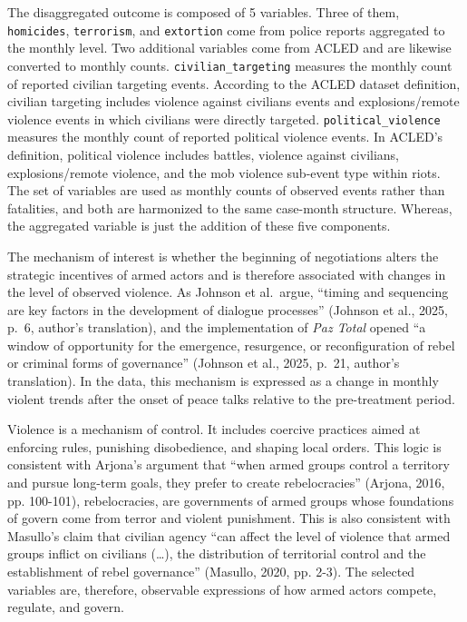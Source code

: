 \documentclass[11pt]{article}
\begin{document}
The disaggregated outcome is composed of 5 variables. Three of them, \texttt{homicides}, \texttt{terrorism}, and \texttt{extortion} come from police reports aggregated to the monthly level. Two additional variables come from ACLED and are likewise converted to monthly counts. \texttt{civilian\_targeting} measures the monthly count of reported civilian targeting events. According to the ACLED dataset definition, civilian targeting includes violence against civilians events and explosions/remote violence events in which civilians were directly targeted. \texttt{political\_violence} measures the monthly count of reported political violence events. In ACLED's definition, political violence includes battles, violence against civilians, explosions/remote violence, and the mob violence sub-event type within riots. The set of variables are used as monthly counts of observed events rather than fatalities, and both are harmonized to the same case-month structure. Whereas, the aggregated variable is just the addition of these five components.

The mechanism of interest is whether the beginning of negotiations alters the strategic incentives of armed actors and is therefore associated with changes in the level of observed violence. As Johnson et al.\ argue, ``timing and sequencing are key factors in the development of dialogue processes'' (Johnson et al., 2025, p.~6, author's translation), and the implementation of \textit{Paz Total} opened ``a window of opportunity for the emergence, resurgence, or reconfiguration of rebel or criminal forms of governance'' (Johnson et al., 2025, p.~21, author's translation). In the data, this mechanism is expressed as a change in monthly violent trends after the onset of peace talks relative to the pre-treatment period.

Violence is a mechanism of control. It includes coercive practices aimed at enforcing rules, punishing disobedience, and shaping local orders. This logic is consistent with Arjona's argument that “when armed groups control a territory and pursue long-term goals, they prefer to create rebelocracies'' (Arjona, 2016, pp. 100-101), rebelocracies, are governments of armed groups whose foundations of govern come from terror and violent punishment. This is also consistent with Masullo's claim that civilian agency “can affect the level of violence that armed groups inflict on civilians (…), the distribution of territorial control and the establishment of rebel governance'' (Masullo, 2020, pp. 2-3). The selected variables are, therefore, observable expressions of how armed actors compete, regulate, and govern. 
\end{document}
